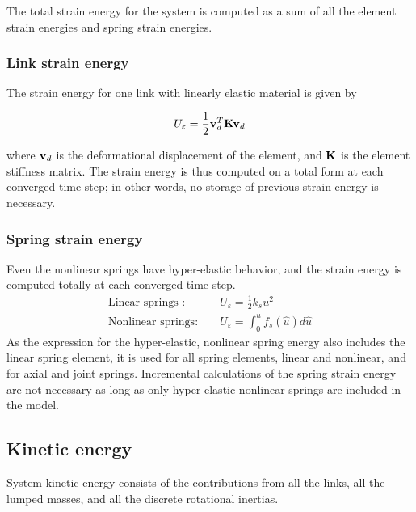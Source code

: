 The total strain energy for the system is computed as a sum of all the 
element strain energies and spring strain energies.

\subsubsection{Link strain energy}

The strain energy for one link with linearly elastic 
material is given by


\begin{equation}
U_{\varepsilon } = \frac{{1}}{{2}}{\bf v}_{d}^{T} {\bf K}{\bf v}_{d}
\label{eqEC:81}
\end{equation}

\noindent
where ${\bf v}_{d}$ is the deformational displacement of the 
element, and ${\bf K}$ is the element stiffness matrix. The strain 
energy is thus computed on a total form at each converged time-step; in other words, no 
storage of previous strain energy is necessary.

\subsubsection{Spring strain energy}

Even the nonlinear springs have hyper-elastic behavior, and the strain 
energy is computed totally at each converged time-step.
%
\begin{eqnarray}
\mbox{Linear springs :\ \ } && U_{\varepsilon} = \frac{{1}}{{2}}k_{s} u^{2} \\
\mbox{Nonlinear springs:\ \ } && U_{\varepsilon } = \int_{0}^{u} f_{s} \left( 
{\hat u} \right) d{\hat u}  \nonumber
\label{eqEC:82}
\end{eqnarray}
%
\noindent
As the expression for the hyper-elastic, nonlinear spring energy also 
includes the linear spring element, it is used for all spring elements, linear and nonlinear,
and for axial and joint springs. Incremental calculations of the spring strain energy are not
necessary as long as only hyper-elastic nonlinear springs are included in the model.

\subsection{Kinetic energy}

System kinetic energy consists of the contributions from all the links, all 
the lumped masses, and all the discrete rotational inertias.

